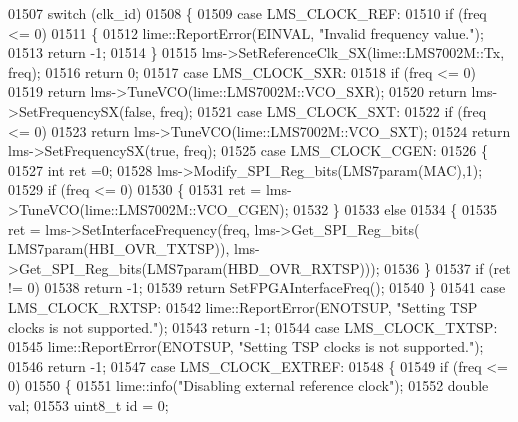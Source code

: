 \begin{DoxyCode}
{{{01507     \textcolor{keywordflow}{switch} (clk\_id)
01508     \{
01509     \textcolor{keywordflow}{case} LMS_CLOCK_REF:
01510         \textcolor{keywordflow}{if} (freq <= 0)
01511         \{
01512             lime::ReportError(EINVAL, \textcolor{stringliteral}{"Invalid frequency value."});
01513             \textcolor{keywordflow}{return} -1;
01514         \}
01515         lms->SetReferenceClk_SX(lime::LMS7002M::Tx, freq);
01516         \textcolor{keywordflow}{return} 0;
01517     \textcolor{keywordflow}{case} LMS_CLOCK_SXR:
01518         \textcolor{keywordflow}{if} (freq <= 0)
01519             \textcolor{keywordflow}{return} lms->TuneVCO(lime::LMS7002M::VCO_SXR);
01520         \textcolor{keywordflow}{return} lms->SetFrequencySX(\textcolor{keyword}{false}, freq);
01521     \textcolor{keywordflow}{case} LMS_CLOCK_SXT:
01522         \textcolor{keywordflow}{if} (freq <= 0)
01523             \textcolor{keywordflow}{return} lms->TuneVCO(lime::LMS7002M::VCO_SXT);
01524         \textcolor{keywordflow}{return} lms->SetFrequencySX(\textcolor{keyword}{true}, freq);
01525     \textcolor{keywordflow}{case} LMS_CLOCK_CGEN:
01526     \{
01527         \textcolor{keywordtype}{int} ret =0;
01528         lms->Modify_SPI_Reg_bits(LMS7param(MAC),1);
01529         \textcolor{keywordflow}{if} (freq <= 0)
01530         \{
01531             ret = lms->TuneVCO(lime::LMS7002M::VCO_CGEN);
01532         \}
01533         \textcolor{keywordflow}{else}
01534         \{
01535             ret = lms->SetInterfaceFrequency(freq, lms->Get_SPI_Reg_bits(
      LMS7param(HBI_OVR_TXTSP)), lms->Get_SPI_Reg_bits(LMS7param(HBD_OVR_RXTSP)));
01536         \}
01537         \textcolor{keywordflow}{if} (ret != 0)
01538             \textcolor{keywordflow}{return} -1;
01539         \textcolor{keywordflow}{return} SetFPGAInterfaceFreq();
01540     \}
01541     \textcolor{keywordflow}{case} LMS_CLOCK_RXTSP:
01542         lime::ReportError(ENOTSUP, \textcolor{stringliteral}{"Setting TSP clocks is not supported."});
01543         \textcolor{keywordflow}{return} -1;
01544     \textcolor{keywordflow}{case} LMS_CLOCK_TXTSP:
01545         lime::ReportError(ENOTSUP, \textcolor{stringliteral}{"Setting TSP clocks is not supported."});
01546         \textcolor{keywordflow}{return} -1;
01547     \textcolor{keywordflow}{case} LMS_CLOCK_EXTREF:
01548         \{
01549             \textcolor{keywordflow}{if} (freq <= 0)
01550             \{
01551                 lime::info(\textcolor{stringliteral}{"Disabling external reference clock"});
01552                 \textcolor{keywordtype}{double} val;
01553                 uint8\_t \textcolor{keywordtype}{id} = 0;
}}}
\end{DoxyCode}
